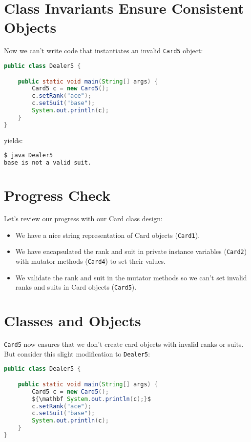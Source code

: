 \documentclass{article}
\begin{document}
\section{Class Invariants Ensure Consistent Objects}


Now we can't write code that instantiates an invalid {\tt Card5} object:
\begin{lstlisting}[language=Java]
public class Dealer5 {

    public static void main(String[] args) {
        Card5 c = new Card5();
        c.setRank("ace");
        c.setSuit("base");
        System.out.println(c);
    }
}
\end{lstlisting}
yields:
\begin{lstlisting}[language=bash]
$ java Dealer5
base is not a valid suit.
\end{lstlisting}


\section{Progress Check}


Let's review our progress with our Card class design:
\begin{itemize}
\item We have a nice string representation of Card objects ({\tt Card1}).
\item We have encapsulated the rank and suit in private instance variables ({\tt Card2}) with mutator methods ({\tt Card4}) to set their values.
\item We validate the rank and suit in the mutator methods so we can't set invalid ranks and suits in Card objects ({\tt Card5}).
\end{itemize}







\section{Classes and Objects}


{\tt Card5} now ensures that we don't create card objects with invalid ranks or suits.
But consider this slight modification to {\tt Dealer5}:
\begin{lstlisting}[language=Java,mathescape=true]
public class Dealer5 {

    public static void main(String[] args) {
        Card5 c = new Card5();
        ${\mathbf System.out.println(c);}$
        c.setRank("ace");
        c.setSuit("base");
        System.out.println(c);
    }
}
\end{lstlisting}
\end{document}
